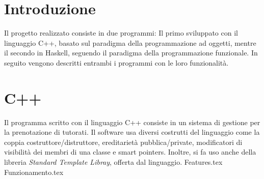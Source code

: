 \documentclass[
	a4paper,
	cleardoublepage=empty,
	headings=twolinechapter,
	numbers=autoenddot,
]{scrbook}
\begin{document}
	\frontmatter
	
	\begin{frontespizio}
		\Margini{3cm}{3cm}{3cm}{3cm}
		\Punteggiatura{}
		\begin{Preambolo*}
			\usepackage[italian]{babel}
			\usepackage[T1]{fontenc}
			\usepackage[utf8]{inputenc}
			\usepackage{microtype}
			\usepackage{lmodern}
			\graphicspath{{img/}}
			
			\renewcommand{\frontinstitutionfont}{\fontsize{14}{17}\bfseries\scshape}
			\renewcommand{\fronttitlefont}{\fontsize{17}{21}\bfseries\scshape}
			\renewcommand{\frontfootfont}{\fontsize{12}{14}\bfseries\scshape}
		\end{Preambolo*}
	\end{frontespizio}
	
	\tableofcontents
	\listoffigures
	\mainmatter
	
	\chapter*{Introduzione}
	Il progetto realizzato consiste in due programmi: Il primo sviluppato con il linguaggio C++, basato sul paradigma della programmazione ad oggetti, mentre il secondo in Haskell, seguendo il paradigma della programmazione funzionale. In seguito vengono descritti entrambi i programmi con le loro funzionalità.
	
	\chapter{C++}
	Il programma scritto con il linguaggio C++ consiste in un sistema di gestione per la prenotazione di tutorati. Il software usa diversi costrutti del linguaggio come la coppia costruttore/distruttore, ereditarietà pubblica/private, modificatori di visibilità dei membri di una classe e smart pointers. Inoltre, si fa uso anche della libreria \textit{Standard Template Libray}, offerta dal linguaggio.
	{Features.tex}
	{Funzionamento.tex}
	
\end{document}
